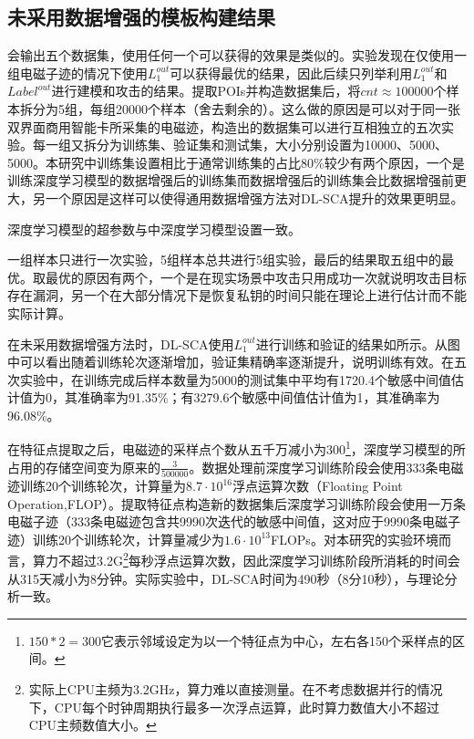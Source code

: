 {{	\subsection{未采用数据增强的模板构建结果}
	会输出五个数据集，使用任何一个可以获得的效果是类似的。实验发现在仅使用一组电磁子迹的情况下使用$L_1^{out}$可以获得最优的结果，因此后续只列举利用$L_1^{out}$和$Label^{out}$进行建模和攻击的结果。提取POIs并构造数据集后，将$cnt\approx100000$个样本拆分为5组，每组20000个样本（舍去剩余的）。这么做的原因是可以对于同一张双界面商用智能卡所采集的电磁迹，构造出的数据集可以进行互相独立的五次实验。每一组又拆分为训练集、验证集和测试集，大小分别设置为10000、5000、5000。本研究中训练集设置相比于通常训练集的占比80\%较少有两个原因，一个是训练深度学习模型的数据增强后的训练集而数据增强后的训练集会比数据增强前更大，另一个原因是这样可以使得通用数据增强方法对DL-SCA提升的效果更明显。
	
	深度学习模型的超参数与中深度学习模型设置一致。
	
	一组样本只进行一次实验，5组样本总共进行5组实验，最后的结果取五组中的最优。取最优的原因有两个，一个是在现实场景中攻击只用成功一次就说明攻击目标存在漏洞，另一个在大部分情况下是恢复私钥的时间只能在理论上进行估计而不能实际计算。
	
	在未采用数据增强方法时，DL-SCA使用$L_1^{out}$进行训练和验证的结果如所示。从图中可以看出随着训练轮次逐渐增加，验证集精确率逐渐提升，说明训练有效。在五次实验中，在训练完成后样本数量为5000的测试集中平均有1720.4个敏感中间值估计值为0，其准确率为91.35\%；有3279.6个敏感中间值估计值为1，其准确率为96.08\%。%
	
	在特征点提取之后，电磁迹的采样点个数从五千万减小为300\footnote{$150*2=300$它表示邻域设定为以一个特征点为中心，左右各150个采样点的区间。}，深度学习模型的所占用的存储空间变为原来的$\frac{3}{500000}$。数据处理前深度学习训练阶段会使用333条电磁迹训练20个训练轮次，计算量为$8.7\cdot10^{16}$浮点运算次数（Floating Point Operation,FLOP）。提取特征点构造新的数据集后深度学习训练阶段会使用一万条电磁子迹（333条电磁迹包含共9990次迭代的敏感中间值，这对应于9990条电磁子迹）训练20个训练轮次，计算量减少为$1.6\cdot10^{13}$FLOPs。对本研究的实验环境而言，算力不超过3.2G\footnote{实际上CPU主频为3.2GHz，算力难以直接测量。在不考虑数据并行的情况下，CPU每个时钟周期执行最多一次浮点运算，此时算力数值大小不超过CPU主频数值大小。}每秒浮点运算次数，因此深度学习训练阶段所消耗的时间会从315天减小为8分钟。实际实验中，DL-SCA时间为490秒（8分10秒），与理论分析一致。%
	
}}
